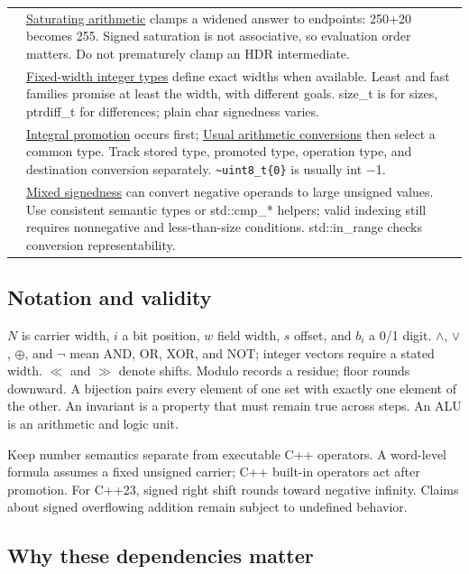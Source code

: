 {\begin{longtable}[]{@{}
  >{\raggedright\arraybackslash}p{}
  >{\raggedright\arraybackslash}p{}@{}}
37 & \hyperref[appendix-3999c6209649]{Saturating arithmetic} clamps a widened answer to endpoints: 250+20 becomes 255. Signed saturation is not associative, so evaluation order matters. Do not prematurely clamp an HDR intermediate. \\
38 & \hyperref[appendix-cc04044b5782]{Fixed-width integer types} define exact widths when available. Least and fast families promise at least the width, with different goals. size\_t is for sizes, ptrdiff\_t for differences; plain char signedness varies. \\
39 & \hyperref[appendix-45303d03796a]{Integral promotion} occurs first; \hyperref[appendix-5e2d663adf7f]{Usual arithmetic conversions} then select a common type. Track stored type, promoted type, operation type, and destination conversion separately. \texttt{\textasciitilde{}uint8\_t\{0\}} is usually int −1. \\
40 & \hyperref[appendix-736a2345de4a]{Mixed signedness} can convert negative operands to large unsigned values. Use consistent semantic types or std::cmp\_* helpers; valid indexing still requires nonnegative and less-than-size conditions. std::in\_range checks conversion representability. \\
\end{longtable}
}

\subsection{Notation and validity}\label{appendix-fd090d982a15-notation-and-validity}

\(N\) is carrier width, \(i\) a bit position, \(w\) field width, \(s\) offset, and \(b_i\) a 0/1 digit. \(\land\), \(\lor\), \(\oplus\), and \(\neg\) mean AND, OR, XOR, and NOT; integer vectors require a stated width. \(\ll\) and \(\gg\) denote shifts. Modulo records a residue; floor rounds downward. A bijection pairs every element of one set with exactly one element of the other. An invariant is a property that must remain true across steps. An ALU is an arithmetic and logic unit.

Keep number semantics separate from executable C++ operators. A word-level formula assumes a fixed unsigned carrier; C++ built-in operators act after promotion. For C++23, signed right shift rounds toward negative infinity. Claims about signed overflowing addition remain subject to undefined behavior.

\subsection{Why these dependencies matter}\label{appendix-fd090d982a15-why-these-dependencies-matter}

